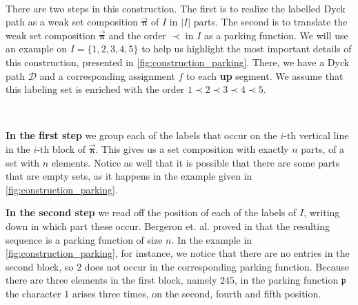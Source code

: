 \documentclass[12pt, reqno]{amsart}
\theoremstyle{definition}
\newcommand{\opi}{\vec{\boldsymbol{\pi}}}
\begin{document}
\

There are two steps in this construction.
The first is to realize the labelled Dyck path as a weak set composition $\opi$ of $I$ in $|I|$ parts. The second is to translate the weak set composition $\opi$ and the order $\prec $ in $I$ as a parking function.
We will use an example on $I = \{1, 2, 3, 4, 5\}$ to help us highlight the most important details of this construction, presented in \cref{fig:construction_parking}.
There, we have a Dyck path $\mathcal D$ and a corresponding assignment $f$ to each \textbf{up} segment.
We assume that this labeling set is enriched with the order $1 \prec 2 \prec 3 \prec 4 \prec 5$.

\

\textbf{In the first step} we group each of the labels that occur on the $i$-th vertical line in the $i$-th block of $\opi$.
This gives us a set composition with exactly $n$ parts, of a set with $n$ elements.
Notice as well that it is possible that there are some parts that are empty sets, as it happens in the example given in \cref{fig:construction_parking}.

\textbf{In the second step} we read off the position of each of the labels of $I$, writing down in which part these occur.
Bergeron et. al. proved in \cite{BGLPV2021} that the resulting sequence is a parking function of size $n$.
In the example in \cref{fig:construction_parking}, for instance, we notice that there are no entries in the second block, so $2$ does not occur in the corresponding parking function.
Because there are three elements in the first block, namely $245$, in the parking function $\mathfrak p $ the character $1$ arises three times, on the second, fourth and fifth position.
\end{document}
